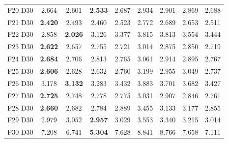 \begin{table}[!t]
{\begin{tabular}{lcccccccc}
F20 D30 & 2.664 & 2.601 & \textbf{2.533} & 2.687 & 2.934 & 2.901 & 2.869 & 2.688 \\
F21 D30 & \textbf{2.420} & 2.493 & 2.460 & 2.523 & 2.772 & 2.689 & 2.653 & 2.511 \\
F22 D30 & 2.858 & \textbf{2.026} & 3.126 & 3.377 & 3.815 & 3.813 & 3.554 & 3.444 \\
F23 D30 & \textbf{2.622} & 2.657 & 2.755 & 2.721 & 3.014 & 2.875 & 2.850 & 2.719 \\
F24 D30 & \textbf{2.684} & 2.706 & 2.813 & 2.765 & 3.061 & 2.914 & 2.895 & 2.767 \\
F25 D30 & \textbf{2.606} & 2.628 & 2.632 & 2.760 & 3.199 & 2.955 & 3.049 & 2.737 \\
F26 D30 & 3.178 & \textbf{3.132} & 3.283 & 3.432 & 3.883 & 3.701 & 3.682 & 3.427 \\
F27 D30 & \textbf{2.725} & 2.748 & 2.778 & 2.775 & 3.031 & 2.907 & 2.846 & 2.761 \\
F28 D30 & \textbf{2.660} & 2.682 & 2.784 & 2.889 & 3.455 & 3.133 & 3.177 & 2.855 \\
F29 D30 & 2.979 & 3.052 & \textbf{2.957} & 3.029 & 3.553 & 3.340 & 3.215 & 3.014 \\
F30 D30 & 7.208 & 6.741 & \textbf{5.304} & 7.628 & 8.841 & 8.766 & 7.658 & 7.111 \\
\bottomrule
\end{tabular}%
}
\end{table}
